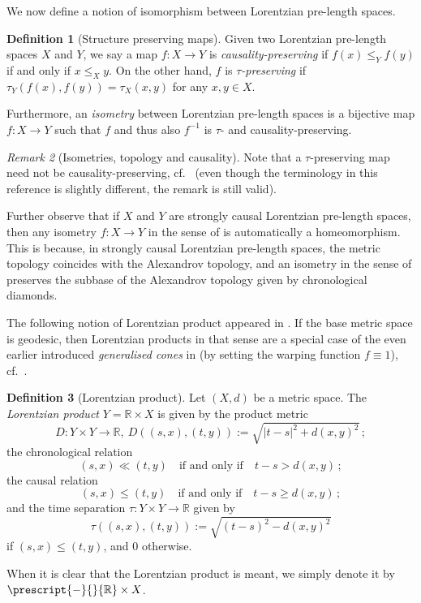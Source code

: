 \documentclass[11pt,reqno]{amsart}
\theoremstyle{definition}
\newcommand{\Cref}[1]{\zcref[S]{#1}}
\theoremstyle{definition}
\newtheorem{dfn}{Definition}[section]
\theoremstyle{plain}
\theoremstyle{remark}
\newtheorem{rem}[dfn]{Remark}
\newcommand{\R}{\mathbb R}
\begin{document}
We now define a notion of isomorphism between Lorentzian pre-length spaces. 

\begin{dfn}[Structure preserving maps]
\label{def:isometry}
Given two Lorentzian pre-length spaces $X$ and $Y$, we say a map $f\colon X\to Y$ is \textit{causality-preserving} if $f(x)\leq_Y f(y)$ if and only if $x\leq_X y$. On the other hand, $f$ is \textit{$\tau$-preserving} if $\tau_Y(f(x),f(y))=\tau_X(x,y)$ for any $x,y\in X$.

Furthermore, an \textit{isometry} between Lorentzian pre-length spaces is a bijective map $f\colon X\to Y$ such that $f$ and thus also $f^{-1}$ is $\tau$- and causality-preserving. 
\end{dfn}

\begin{rem}[Isometries, topology and causality]
Note that a $\tau$-preserving map need not be causality-preserving, cf.\ \cite[Remark 3.2.6]{BR24} (even though the terminology in this reference is slightly different, the remark is still valid). 

Further observe that if $X$ and $Y$ are strongly causal Lorentzian pre-length spaces, then any isometry $f\colon X\to Y$ in the sense of \Cref{def:isometry} is automatically a homeomorphism. This is because, in strongly causal Lorentzian pre-length spaces, the metric topology coincides with the Alexandrov topology, and an isometry in the sense of \Cref{def:isometry} preserves the subbase of the Alexandrov topology given by chronological diamonds. 
\end{rem}

The following notion of Lorentzian product appeared in \cite[Definition 3.1]{BORS23}. 
If the base metric space is geodesic, then Lorentzian products in that sense are a special case of the even earlier introduced \emph{generalised cones} in \cite{alexander-graf-kunzinger-saemann2023} (by setting the warping function $f \equiv 1$), cf.\ \cite[Proposition~3.6]{Ber25}. 

\begin{dfn}[Lorentzian product]
\label{def: lor product}
Let $(X,d)$ be a metric space. The \textit{Lorentzian product} $Y= \R \times X$ is given by the product metric 
\begin{equation*}
D\colon Y \times Y \to \R, \ D((s,x),(t,y)):=\sqrt{|t-s|^2+d(x,y)^2} \, ;    
\end{equation*}
the chronological relation 
\[(s,x) \ll (t,y)\quad \text{if and only if}\quad t-s > d(x,y) \, ;\] the causal relation \[(s,x) \leq (t,y) \quad \text{if and only if}\quad t-s \geq d(x,y) \, ;\] and the time separation $\tau\colon Y \times Y \to \R$ given by 
\begin{equation*}
\tau((s,x),(t,y)):=\sqrt{(t-s)^2 - d(x,y)^2}    
\end{equation*}
if $(s,x) \leq (t,y)$, and $0$ otherwise. 

When it is clear that the Lorentzian product is meant, we simply denote it by $\prescript{-}{}{\R}\times X$.
\end{dfn}
\end{document}
